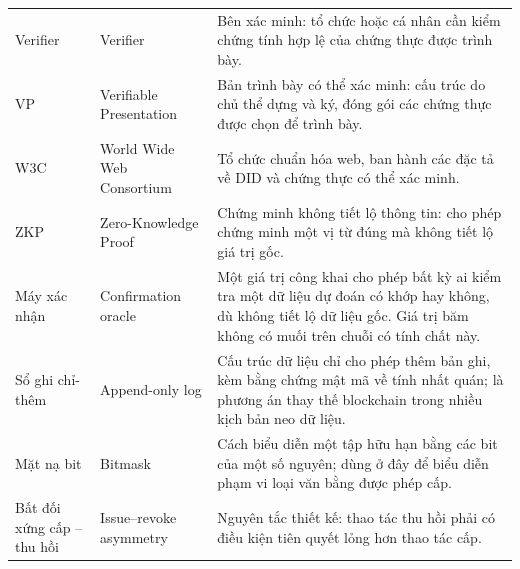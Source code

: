 \begin{longtable}{p{} p{} p{}}
Verifier & Verifier & Bên xác minh: tổ chức hoặc cá nhân cần kiểm chứng tính hợp lệ của chứng thực được trình bày. \\

VP & Verifiable Presentation & Bản trình bày có thể xác minh: cấu trúc do chủ thể dựng và ký, đóng gói các chứng thực được chọn để trình bày. \\

W3C & World Wide Web Consortium & Tổ chức chuẩn hóa web, ban hành các đặc tả về DID và chứng thực có thể xác minh. \\

ZKP & Zero-Knowledge Proof & Chứng minh không tiết lộ thông tin: cho phép chứng minh một vị từ đúng mà không tiết lộ giá trị gốc. \\

Máy xác nhận & Confirmation oracle & Một giá trị công khai cho phép bất kỳ ai kiểm tra một dữ liệu dự đoán có khớp hay không, dù không tiết lộ dữ liệu gốc. Giá trị băm không có muối trên chuỗi có tính chất này. \\

Sổ ghi chỉ-thêm & Append-only log & Cấu trúc dữ liệu chỉ cho phép thêm bản ghi, kèm bằng chứng mật mã về tính nhất quán; là phương án thay thế blockchain trong nhiều kịch bản neo dữ liệu. \\

Mặt nạ bit & Bitmask & Cách biểu diễn một tập hữu hạn bằng các bit của một số nguyên; dùng ở đây để biểu diễn phạm vi loại văn bằng được phép cấp. \\

Bất đối xứng cấp -- thu hồi & Issue--revoke asymmetry & Nguyên tắc thiết kế: thao tác thu hồi phải có điều kiện tiên quyết lỏng hơn thao tác cấp. \\

\end{longtable}
